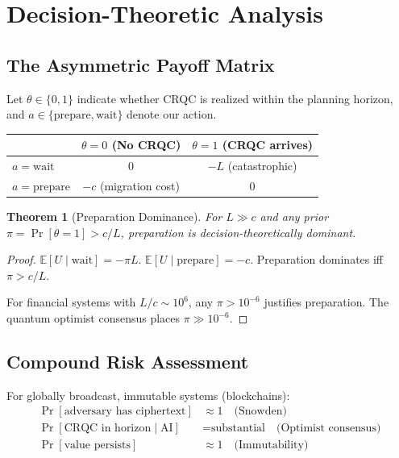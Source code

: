 \documentclass[11pt,a4paper]{article}
\newtheorem{theorem}{Theorem}[section]
\begin{document}
\section{Decision-Theoretic Analysis}

\subsection{The Asymmetric Payoff Matrix}

Let $\theta \in \{0, 1\}$ indicate whether CRQC is realized within the planning horizon, and $a \in \{\text{prepare}, \text{wait}\}$ denote our action.

\begin{center}
\begin{tabular}{lcc}
\toprule
& $\theta = 0$ (No CRQC) & $\theta = 1$ (CRQC arrives) \\
\midrule
$a = \text{wait}$ & 0 & $-L$ (catastrophic) \\
$a = \text{prepare}$ & $-c$ (migration cost) & 0 \\
\bottomrule
\end{tabular}
\end{center}

\begin{theorem}[Preparation Dominance]
For $L \gg c$ and any prior $\pi = \Pr[\theta = 1] > c/L$, preparation is decision-theoretically dominant.
\end{theorem}

\begin{proof}
$\mathbb{E}[U \mid \text{wait}] = -\pi L$. $\mathbb{E}[U \mid \text{prepare}] = -c$. Preparation dominates iff $\pi > c/L$.

For financial systems with $L/c \sim 10^6$, any $\pi > 10^{-6}$ justifies preparation. The quantum optimist consensus places $\pi \gg 10^{-6}$.
\end{proof}

\subsection{Compound Risk Assessment}

For globally broadcast, immutable systems (blockchains):
\begin{align}
\Pr[\text{adversary has ciphertext}] &\approx 1 \quad \text{(Snowden)} \\
\Pr[\text{CRQC in horizon} \mid \text{AI}] &= \text{substantial} \quad \text{(Optimist consensus)} \\
\Pr[\text{value persists}] &\approx 1 \quad \text{(Immutability)}
\end{align}
\end{document}
